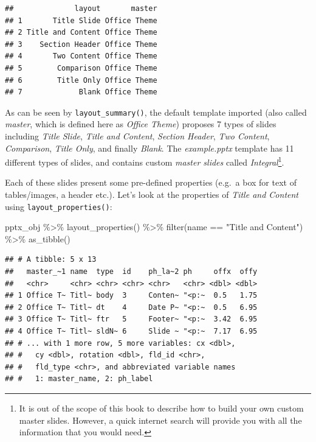 \documentclass[
]{krantz}
\makeatletter
\newenvironment{Shaded}{\begin{snugshade}}{\end{snugshade}}
\newcommand{\FunctionTok}[1]{\textcolor[rgb]{0,0,0}{#1}}
\newcommand{\NormalTok}[1]{#1}
\newcommand{\SpecialCharTok}[1]{\textcolor[rgb]{0,0,0}{#1}}
\newcommand{\StringTok}[1]{\textcolor[rgb]{0.5,0.5,0.5}{#1}}
\newenvironment{kframe}{%
\medskip{}
\setlength{\fboxsep}{.8em}
 \def\at@end@of@kframe{}%
 \ifinner\ifhmode%
  \def\at@end@of@kframe{\end{minipage}}%
  \begin{minipage}{\columnwidth}%
 \fi\fi%
 \def\FrameCommand##1{\hskip\@totalleftmargin \hskip-\fboxsep
 \colorbox{shadecolor}{##1}\hskip-\fboxsep
     \hskip-\linewidth \hskip-\@totalleftmargin \hskip\columnwidth}%
 \MakeFramed {\advance\hsize-\width
   \@totalleftmargin\z@ \linewidth\hsize
   \@setminipage}}%
 {\par\unskip\endMakeFramed%
 \at@end@of@kframe}
\renewenvironment{Shaded}{\begin{kframe}}{\end{kframe}}
\makeatother
\begin{document}
\begin{verbatim}
##              layout       master
## 1       Title Slide Office Theme
## 2 Title and Content Office Theme
## 3    Section Header Office Theme
## 4       Two Content Office Theme
## 5        Comparison Office Theme
## 6        Title Only Office Theme
## 7             Blank Office Theme
\end{verbatim}

As can be seen by \texttt{layout\_summary()}, the default template imported (also called \emph{master}, which is defined here as \emph{Office Theme}) proposes 7 types of slides including \emph{Title Slide}, \emph{Title and Content}, \emph{Section Header}, \emph{Two Content}, \emph{Comparison}, \emph{Title Only}, and finally \emph{Blank}. The \emph{example.pptx} template has 11 different types of slides, and contains custom \emph{master slides} called \emph{Integral}\footnote{It is out of the scope of this book to describe how to build your own custom master slides. However, a quick internet search will provide you with all the information that you would need.}.

Each of these slides present some pre-defined properties (e.g.~a box for text of tables/images, a header etc.). Let's look at the properties of \emph{Title and Content} using \texttt{layout\_properties()}:

\begin{Shaded}
\begin{Highlighting}[]
\NormalTok{pptx\_obj }\SpecialCharTok{\%\textgreater{}\%} 
  \FunctionTok{layout\_properties}\NormalTok{() }\SpecialCharTok{\%\textgreater{}\%} 
  \FunctionTok{filter}\NormalTok{(name }\SpecialCharTok{==} \StringTok{"Title and Content"}\NormalTok{) }\SpecialCharTok{\%\textgreater{}\%} 
  \FunctionTok{as\_tibble}\NormalTok{()}
\end{Highlighting}
\end{Shaded}

\begin{verbatim}
## # A tibble: 5 x 13
##   master_~1 name  type  id    ph_la~2 ph     offx  offy
##   <chr>     <chr> <chr> <chr> <chr>   <chr> <dbl> <dbl>
## 1 Office T~ Titl~ body  3     Conten~ "<p:~  0.5   1.75
## 2 Office T~ Titl~ dt    4     Date P~ "<p:~  0.5   6.95
## 3 Office T~ Titl~ ftr   5     Footer~ "<p:~  3.42  6.95
## 4 Office T~ Titl~ sldN~ 6     Slide ~ "<p:~  7.17  6.95
## # ... with 1 more row, 5 more variables: cx <dbl>,
## #   cy <dbl>, rotation <dbl>, fld_id <chr>,
## #   fld_type <chr>, and abbreviated variable names
## #   1: master_name, 2: ph_label
\end{verbatim}
\end{document}
